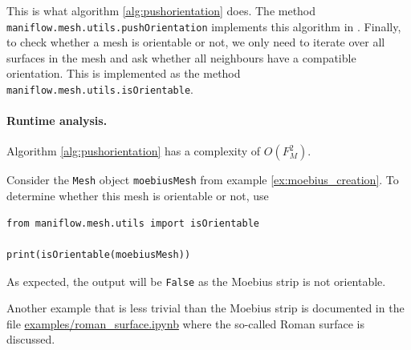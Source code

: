 This is what algorithm \ref{alg:pushorientation} does. The method \texttt{maniflow.mesh.utils.pushOrientation} implements this algorithm in \maniflow{}.
Finally, to check whether a mesh is orientable or not, we only need to iterate over all surfaces in the mesh and ask whether all neighbours have a compatible orientation. This is implemented as the method \texttt{maniflow.mesh.utils.isOrientable}.
\paragraph{Runtime analysis.}  Algorithm \ref{alg:pushorientation} has a complexity of $O(F_M^2)$. %
\begin{ex}
    Consider the \texttt{Mesh} object \texttt{moebiusMesh} from example \ref{ex:moebius_creation}. To determine whether this mesh is orientable or not, use
    \begin{lstlisting}
from maniflow.mesh.utils import isOrientable

print(isOrientable(moebiusMesh))
    \end{lstlisting}
    As expected, the output will be \texttt{False} as the Moebius strip is not orientable.
\end{ex}
\noindent Another example that is less trivial than the Moebius strip is documented in the file \href{https://gitlab.gwdg.de/yangshan.xiang/scientific-computing/-/blob/28846b92bf3f99fa84b650267886782c43791715/examples/roman_surface.ipynb}{\url{examples/roman\_surface.ipynb}} where the so-called Roman surface is discussed.
